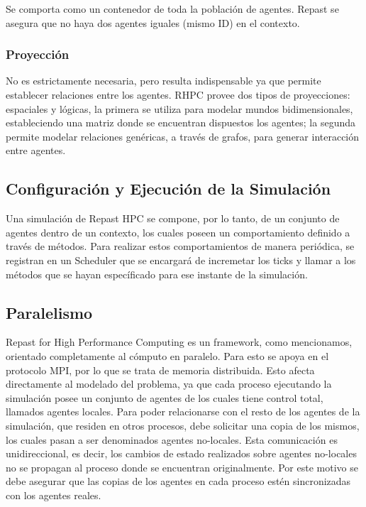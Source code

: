 Se comporta como un contenedor de toda la población de agentes. Repast
se asegura que no haya dos agentes iguales (mismo ID) en el contexto.

\subsubsection{Proyección}

No es estrictamente necesaria, pero resulta indispensable ya que permite
establecer relaciones entre los agentes. RHPC provee dos tipos de
proyecciones: espaciales y lógicas, la primera se utiliza para modelar
mundos bidimensionales, estableciendo una matriz donde se encuentran
dispuestos los agentes; la segunda permite modelar relaciones genéricas,
a través de grafos, para generar interacción entre agentes.

\subsection{Configuración y Ejecución de la Simulación}

Una simulación de Repast HPC se compone, por lo tanto, de un conjunto de
agentes dentro de un contexto, los cuales poseen un comportamiento
definido a través de métodos. Para realizar estos comportamientos de
manera periódica, se registran en un Scheduler que se encargará de
incremetar los ticks y llamar a los métodos que se hayan específicado
para ese instante de la simulación.

\subsection{Paralelismo}

Repast for High Performance Computing es un framework, como mencionamos,
orientado completamente al cómputo en paralelo. Para esto se apoya en el
protocolo MPI, por lo que se trata de memoria distribuida. Esto afecta
directamente al modelado del problema, ya que cada proceso ejecutando la
simulación posee un conjunto de agentes de los cuales tiene control
total, llamados agentes locales. Para poder relacionarse con el resto de
los agentes de la simulación, que residen en otros procesos, debe
solicitar una copia de los mismos, los cuales pasan a ser denominados
agentes no-locales. Esta comunicación es unidireccional, es decir, los
cambios de estado realizados sobre agentes no-locales no se propagan al
proceso donde se encuentran originalmente. Por este motivo se debe
asegurar que las copias de los agentes en cada proceso estén
sincronizadas con los agentes reales.

